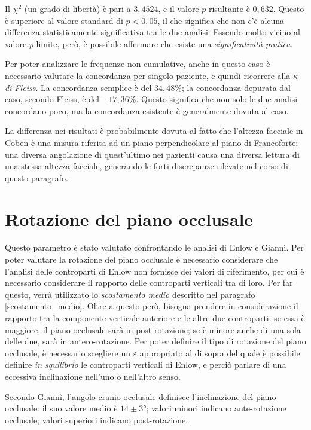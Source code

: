 Il $\chi^2$ (un grado di libertà) è pari a $3,4524$, e il valore $p$ risultante è $0,632$. Questo è superiore al valore standard di $p < 0,05$, il che significa che non c'è alcuna differenza statisticamente significativa tra le due analisi. Essendo molto vicino al valore $p$ limite, però, è possibile affermare che esiste una \emph{significatività pratica}.

Per poter analizzare le frequenze non cumulative, anche in questo caso è necessario valutare la concordanza per singolo paziente, e quindi ricorrere alla \emph{$\kappa$ di Fleiss}. La concordanza semplice è del $34,48\%$; la concordanza depurata dal caso, secondo Fleiss, è del $-17,36\%$. Questo significa che non solo le due analisi concordano poco, ma la concordanza esistente è generalmente dovuta al caso.

La differenza nei risultati è probabilmente dovuta al fatto che l'altezza facciale in Coben è una misura riferita ad un piano perpendicolare al piano di Francoforte: una diversa angolazione di quest'ultimo nei pazienti causa una diversa lettura di una stessa altezza facciale, generando le forti discrepanze rilevate nel corso di questo paragrafo.

\section{Rotazione del piano occlusale}
Questo parametro è stato valutato confrontando le analisi di Enlow e Giannì. Per poter valutare la rotazione del piano occlusale è necessario considerare che l'analisi delle controparti di Enlow non fornisce dei valori di riferimento, per cui è necessario considerare il rapporto delle controparti verticali tra di loro. Per far questo, verrà utilizzato lo \emph{scostamento medio} descritto nel paragrafo \vref{scostamento_medio}. Oltre a questo però, bisogna prendere in considerazione il rapporto tra la componente verticale anteriore e le altre due controparti: se essa è maggiore, il piano occlusale sarà in post-rotazione; se è minore anche di una sola delle due, sarà in antero-rotazione. Per poter definire il tipo di rotazione del piano occlusale, è necessario scegliere un $\varepsilon$ appropriato al di sopra del quale è possibile definire \emph{in squilibrio} le controparti verticali di Enlow, e perciò parlare di una eccessiva inclinazione nell'uno o nell'altro senso.

Secondo Giannì, l'angolo cranio-occlusale definisce l'inclinazione del piano occlusale: il suo valore medio è $14 \pm 3°$; valori minori indicano ante-rotazione occlusale; valori superiori indicano post-rotazione.

